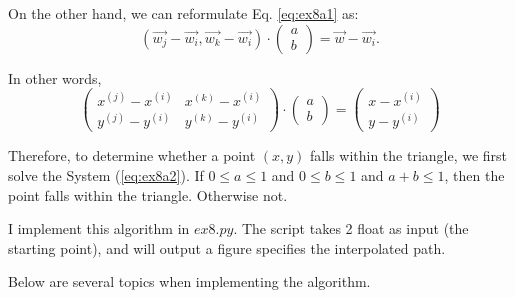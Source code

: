 \documentclass[
  course = {{16-811 Math Fundamentals for Robotics}},
  quartile = {{1}},
  assignment = 2,
  name = {{Kangle Deng}},
  email = {{kangled@andrew.cmu.edu}},
  firstexercise = 1
]{aga-homework}
\begin{document}
On the other hand, we can reformulate Eq. \ref{eq:ex8a1} as:
\begin{equation*}
    (\Vec{w_j} - \Vec{w_i}, \Vec{w_k} - \Vec{w_i}) \cdot \left(
        \begin{array}{c}
         a \\
         b
    \end{array}
    \right) = \Vec{w} - \Vec{w_i}.
\end{equation*}

In other words,
\begin{equation}
    \left(
        \begin{array}{cc}
         x^{(j)} - x^{(i)} & x^{(k)} - x^{(i)} \\
         y^{(j)} - y^{(i)} & y^{(k)} - y^{(i)}
    \end{array}
    \right) \cdot
    \left(
    \begin{array}{c}
         a \\
         b
    \end{array}
    \right) =
    \left(
    \begin{array}{c}
        x - x^{(i)} \\
        y - y^{(i)}
    \end{array}
    \right)
\label{eq:ex8a2}
\end{equation}

Therefore, to determine whether a point $(x,y)$ falls within the triangle, we first solve the System (\ref{eq:ex8a2}). If $0 \le a \le 1$ and $0 \le b \le 1$ and $a + b \le 1$, then the point falls within the triangle. Otherwise not.

\subexercise
I implement this algorithm in $ex8.py$. The script takes 2 float as input (the starting point), and will output a figure specifies the interpolated path.

\subexercise Below are several topics when implementing the algorithm.
\end{document}
